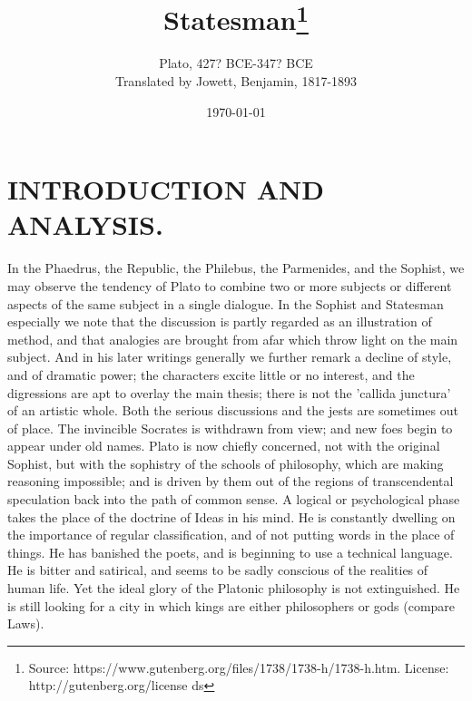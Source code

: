 \documentclass[11pt,letter]{article}
\begin{document}
\title{Statesman\thanks{Source: https://www.gutenberg.org/files/1738/1738-h/1738-h.htm. License: http://gutenberg.org/license ds}}
\date{\today}
\author{Plato, 427? BCE-347? BCE\\ Translated by Jowett, Benjamin, 1817-1893}
\maketitle

\setcounter{tocdepth}{1}
\tableofcontents
\renewcommand{\baselinestretch}{1.0}
\normalsize
\newpage

\section{
      INTRODUCTION AND ANALYSIS.
    }
\par  In the Phaedrus, the Republic, the Philebus, the Parmenides, and the Sophist, we may observe the tendency of Plato to combine two or more subjects or different aspects of the same subject in a single dialogue. In the Sophist and Statesman especially we note that the discussion is partly regarded as an illustration of method, and that analogies are brought from afar which throw light on the main subject. And in his later writings generally we further remark a decline of style, and of dramatic power; the characters excite little or no interest, and the digressions are apt to overlay the main thesis; there is not the 'callida junctura' of an artistic whole. Both the serious discussions and the jests are sometimes out of place. The invincible Socrates is withdrawn from view; and new foes begin to appear under old names. Plato is now chiefly concerned, not with the original Sophist, but with the sophistry of the schools of philosophy, which are making reasoning impossible; and is driven by them out of the regions of transcendental speculation back into the path of common sense. A logical or psychological phase takes the place of the doctrine of Ideas in his mind. He is constantly dwelling on the importance of regular classification, and of not putting words in the place of things. He has banished the poets, and is beginning to use a technical language. He is bitter and satirical, and seems to be sadly conscious of the realities of human life. Yet the ideal glory of the Platonic philosophy is not extinguished. He is still looking for a city in which kings are either philosophers or gods (compare Laws).
\end{document}
